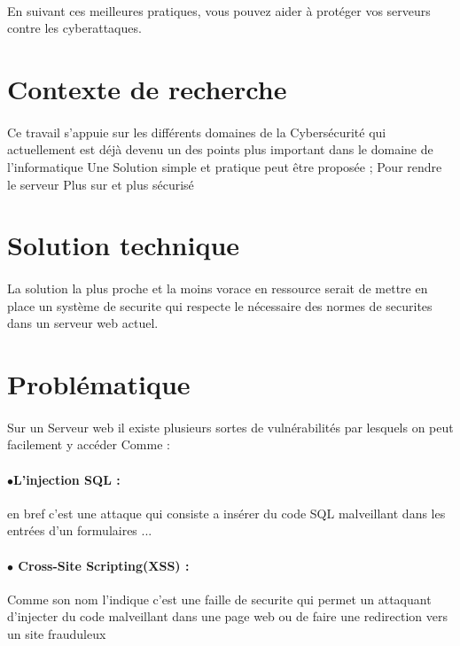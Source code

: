 \paragraph{ }
  \begin{Large}
  	En suivant ces meilleures pratiques, vous pouvez aider à protéger vos serveurs contre les cyberattaques.
  \end{Large}
  
   
   \section{Contexte de recherche }
   \paragraph{ } Ce travail s'appuie sur les différents domaines   de la  Cybersécurité qui actuellement est déjà devenu un  des points  plus   important dans le domaine de l'informatique 
   Une Solution simple et pratique peut être proposée  \space;
   Pour rendre le serveur Plus sur et plus sécurisé
   \section{Solution technique} 
   \paragraph{ }
   La solution la plus proche et la moins vorace en ressource serait de mettre en place un système de securite qui respecte le nécessaire des normes de securites dans un serveur web actuel.
   \section{Problématique }
   \paragraph{ }
   Sur un Serveur web il existe plusieurs sortes de vulnérabilités par lesquels on peut facilement y accéder Comme : 
     \paragraph {$\bullet$L'injection SQL : }
      en bref c'est une attaque qui consiste a insérer du code SQL malveillant  dans les entrées   d'un formulaires ...
   
   \paragraph{$\bullet$ Cross-Site Scripting(XSS) :} Comme son nom l'indique c'est une faille de securite qui permet un attaquant d'injecter du code malveillant dans une page web ou de faire une redirection vers un site frauduleux 
